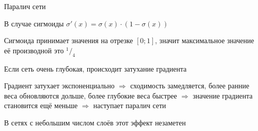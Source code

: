 \documentclass[notes,12pt, aspectratio=169]{beamer}
\newenvironment{wideitemize}{\itemize\addtolength{\itemsep}{10pt}}{\enditemize}
\begin{document}
\begin{frame}{Паралич сети}
	\begin{wideitemize}
		\item  В случае сигмоиды $\sigma'(x) = \sigma(x) \cdot (1 - \sigma(x))$ 
		
		\item Сигмоида принимает значения на отрезке $[0; 1]$, значит максимальное значение её производной это $^1/_4$
		
		\item Если сеть очень глубокая, происходит \alert{затухание градиента} 
		
		\item Градиент затухает экспоненциально $\Rightarrow$ сходимость замедляется, более ранние веса обновляются дольше, более глубокие веса быстрее  $\Rightarrow$ значение градиента становится ещё меньше $\Rightarrow$ наступает \alert{паралич сети} 
		
		\item В сетях с небольшим числом слоёв этот эффект незаметен
	\end{wideitemize} 
\end{frame}
\end{document}
